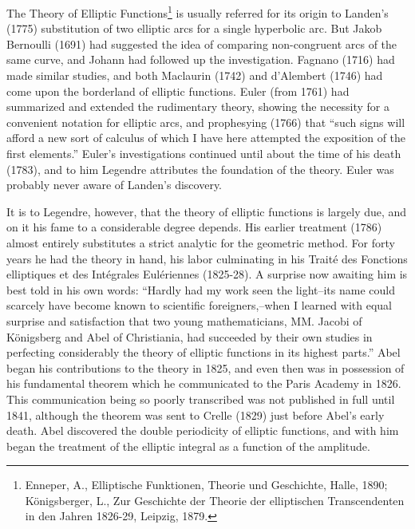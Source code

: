 \documentclass[oneside]{book}
\begin{document}
{The Theory of Elliptic Functions\footnote{Enneper, A., Elliptische
Funktionen, Theorie und Geschichte, Halle, 1890; K\"onigsberger, L.,
Zur Geschichte der Theorie der elliptischen Transcendenten in den
Jahren 1826-29, Leipzig, 1879.} is usually referred for its origin
to Landen's (1775) substitution of two elliptic arcs for a single
hyperbolic arc. But Jakob Bernoulli (1691) had suggested the idea of
comparing non-congruent arcs of the same curve, and Johann had
followed up the investigation. Fagnano (1716) had made similar
studies, and both Maclaurin (1742) and d'Alembert (1746) had come
upon the borderland of elliptic functions. Euler (from 1761) had
summarized and extended the rudimentary theory, showing the
necessity for a convenient notation for elliptic arcs, and
prophesying (1766) that ``such signs will afford a new sort of
calculus of which I have here attempted the exposition of the first
elements.'' Euler's investigations continued until about the time of
his death (1783), and to him Legendre attributes the foundation of
the theory. Euler was probably never aware of Landen's discovery.

It is to Legendre, however, that the theory of elliptic functions is
largely due, and on it his fame to a considerable degree
depends. His earlier treatment (1786) almost entirely substitutes a
strict analytic for the geometric method. For forty years he had the
theory in hand, his labor culminating in his Trait\'e des Fonctions
elliptiques et des Int\'egrales Eul\'eriennes (1825-28). A surprise
now awaiting him is best told in his own words: ``Hardly had my work
seen the light--its name could scarcely have become known to
scientific foreigners,--when I learned with equal surprise and
satisfaction that two young mathematicians, MM. Jacobi of
K\"onigsberg and Abel of Christiania, had succeeded by their own
studies in perfecting considerably the theory of elliptic functions
in its highest parts.'' Abel began his contributions to the theory
in 1825, and even then was in possession of his fundamental theorem
which he communicated to the Paris Academy in 1826. This
communication being so poorly transcribed was not published in full
until 1841, although the theorem was sent to Crelle (1829) just
before Abel's early death. Abel discovered the double periodicity of
elliptic functions, and with him began the treatment of the elliptic
integral as a function of the amplitude.

}
\end{document}
